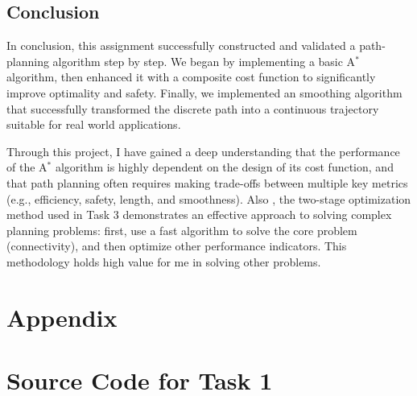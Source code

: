 \documentclass[aps,letterpaper,10pt]{revtex4}
\begin{document}
\subsection{Conclusion}
In conclusion, this assignment successfully constructed and validated a  path-planning algorithm step by step. We began by implementing a basic A$^*$ algorithm, then enhanced it with a composite cost function to significantly improve optimality and safety. Finally, we implemented an smoothing algorithm that successfully transformed the discrete path into a continuous trajectory suitable for real world applications.

Through this project, I have gained a deep understanding that the performance of the A$^*$ algorithm is highly dependent on the design of its cost function, and that path planning often requires making trade-offs between multiple key metrics (e.g., efficiency, safety, length, and smoothness). Also ,  the two-stage optimization method used in Task 3 demonstrates an effective approach to solving complex planning problems: first, use a fast algorithm to solve the core problem (connectivity), and then optimize other performance indicators. This methodology holds high value for me in solving other problems.



\newpage
\section{Appendix}
\appendix
\section{Source Code for Task 1}
\label{sec:appendix_task1}
\end{document}
